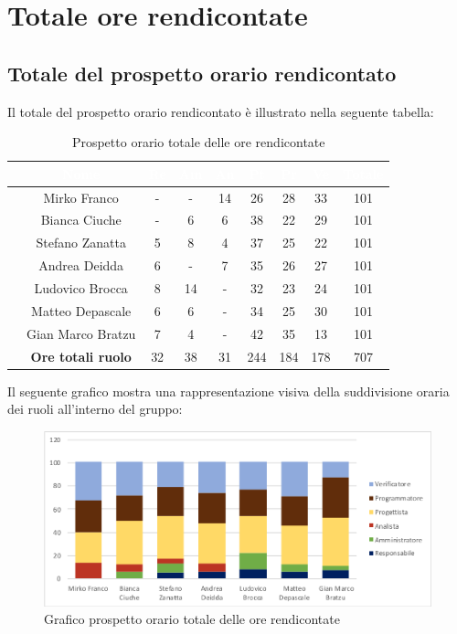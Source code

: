 \section{Totale ore rendicontate}
\subsection{Totale del  prospetto orario rendicontato}
Il totale del prospetto orario rendicontato è illustrato nella seguente tabella:

\begin{table}[ht]
	\begin{center}
		\begin{tabular}{ccccccccc}
			\rowcolor{coolblack}
			\hline
			& \textcolor{white}{Nome} & \textcolor{white}{Re} & \textcolor{white}{Am} & \textcolor{white}{An} & \textcolor{white}{Pt} &\textcolor{white}{Pr} & \textcolor{white}{Ve} & \textcolor{white}{Totale} \\
			\hline
			&Mirko Franco & - & - & 14 & 26& 28 & 33 & 101  \\
			&Bianca Ciuche & -& 6& 6 & 38 & 22& 29 &101 \\
			&Stefano Zanatta & 5 & 8& 4 & 37 & 25 & 22 & 101 \\
			&Andrea Deidda &  6& - & 7 &35 & 26 & 27 & 101\\
			&Ludovico Brocca & 8& 14 & - & 32 & 23 & 24 & 101 \\
			&Matteo Depascale & 6& 6& - & 34& 25& 30& 101\\
			&Gian Marco Bratzu & 7& 4 & - & 42 & 35 & 13 &101 \\
			\hline
			&\textbf{Ore totali ruolo} & 32& 38 & 31 & 244 & 184 & 178 & 707 \\
		\end{tabular}
		\caption{Prospetto orario totale delle ore rendicontate}
	\end{center}
\end{table}


Il seguente grafico mostra una rappresentazione visiva della suddivisione oraria dei ruoli all'interno del gruppo:
\begin{figure}[!ht]
	\begin{center}
		\includegraphics[scale=0.80]{images/grafoOreRendicontate.png}
		\caption{Grafico prospetto orario totale delle ore rendicontate}
	\end{center}
\end{figure}

